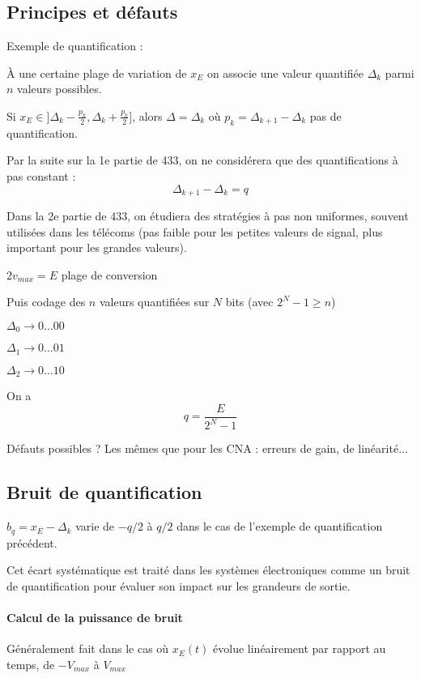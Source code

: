 \documentclass[main.tex]{subfiles}
\begin{document}
\subsection{Principes et défauts}

Exemple de quantification :

À une certaine plage de variation de $x_E$ on associe une valeur quantifiée $\Delta_k$ parmi $n$ valeurs possibles.

Si $x_E \in ]\Delta_k - \frac{p_k}{2}, \Delta_k + \frac{p_k}{2}]$, alors $\Delta = \Delta_k$ où $p_k=\Delta_{k+1} - \Delta_k$ pas de quantification.

\begin{rem}
Par la suite sur la 1e partie de 433, on ne considérera que des quantifications à pas constant : \[\Delta_{k+1}-\Delta_k=q\]

Dans la 2e partie de 433, on étudiera des stratégies à pas non uniformes, souvent utilisées dans les télécoms (pas faible pour les petites valeurs de signal, plus important pour les grandes valeurs).
\end{rem}

$2v_{max}=E$ plage de conversion

Puis codage des $n$ valeurs quantifiées sur $N$ bits (avec $2^N-1\geq n$)

\begin{exemple}

$\Delta_0 \to 0\dots00$

$\Delta_1 \to 0\dots01$

$\Delta_2 \to 0\dots10$
\end{exemple}

On a \[q=\frac{E}{2^N-1}\]

Défauts possibles ? Les mêmes que pour les CNA : erreurs de gain, de linéarité...



\subsection{Bruit de quantification}

$b_q=x_E-\Delta_k$ varie de $-q/2$ à $q/2$ dans le cas de l'exemple de quantification précédent.

Cet écart systématique est traité dans les systèmes électroniques comme un bruit de quantification pour évaluer son impact sur les grandeurs de sortie.

\paragraph{Calcul de la puissance de bruit} Généralement fait dans le cas où $x_E(t)$ évolue linéairement par rapport au temps,  de $-V_{max}$ à $V_{max}$
\end{document}

